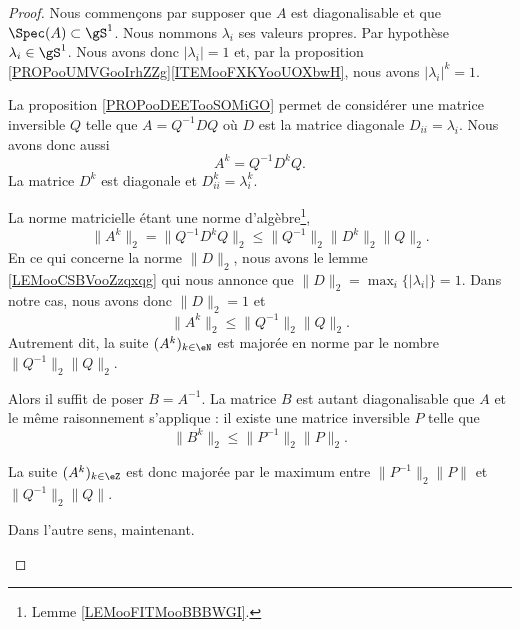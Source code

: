 \begin{proof}
	Nous commençons par supposer que \( A\) est diagonalisable et que \( \Spec(A)\subset \gS^1\). Nous nommons \( \lambda_i\) ses valeurs propres. Par hypothèse \( \lambda_i\in \gS^1\). Nous avons donc \( | \lambda_i |=1\) et, par la proposition \ref{PROPooUMVGooIrhZZg}\ref{ITEMooFXKYooUOXbwH}, nous avons \( | \lambda_i |^k=1\).

	La proposition \ref{PROPooDEETooSOMiGO} permet de considérer une matrice inversible \( Q\) telle que \( A=Q^{-1}DQ\) où \( D\) est la matrice diagonale \( D_{ii}=\lambda_i\). Nous avons donc aussi
	\begin{equation}
		A^k=Q^{-1}D^kQ.
	\end{equation}
	La matrice \( D^k\) est diagonale et \( D^k_{ii}=\lambda_i^k\).

	\begin{subproof}
		La norme matricielle étant une norme d'algèbre\footnote{Lemme \ref{LEMooFITMooBBBWGI}.},
		\begin{equation}
			\| A^k \|_2=\| Q^{-1}D^kQ \|_2\leq \| Q^{-1} \|_2\| D^k \|_2\| Q \|_2.
		\end{equation}
		En ce qui concerne la norme \( \| D \|_2\), nous avons le lemme \ref{LEMooCSBVooZzqxqg} qui nous annonce que \( \| D \|_2=\max_i \{| \lambda_i |\}=1 \). Dans notre cas, nous avons donc \( \| D \|_2=1\) et
		\begin{equation}
			\| A^k \|_2\leq \| Q^{-1} \|_2\| Q \|_2.
		\end{equation}
		Autrement dit, la suite \( (A^k)_{k\in \eN}\) est majorée en norme par le nombre \( \| Q^{-1} \|_2\| Q \|_2\).

		Alors il suffit de poser \( B=A^{-1}\). La matrice \( B\) est autant diagonalisable que \( A\) et le même raisonnement s'applique : il existe une matrice inversible \( P\) telle que
		\begin{equation}
			\| B^k \|_2\leq \| P^{-1} \|_2\| P \|_2.
		\end{equation}

		La suite \( (A^k)_{k\in \eZ}\) est donc majorée par le maximum entre \( \| P^{-1} \|_2\| P \|\) et \( \| Q^{-1} \|_2\| Q \|\).
	\end{subproof}

	\begin{center}
		Dans l'autre sens, maintenant.
	\end{center}


\end{proof}
